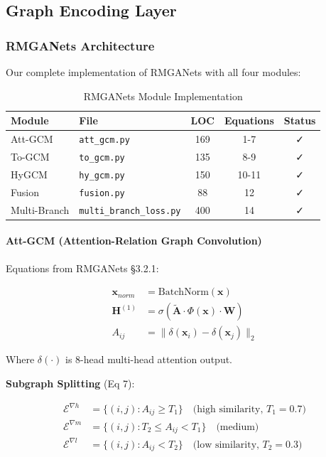 \documentclass[11pt,a4paper]{article}
\begin{document}
\subsection{Graph Encoding Layer}

\subsubsection{RMGANets Architecture}

Our complete implementation of RMGANets \cite{rmganets2024} with all four modules:

\begin{table}[htbp]
\centering
\caption{RMGANets Module Implementation}
\label{tab:rmganets_modules}
\begin{tabular}{@{}llccc@{}}
\toprule
\textbf{Module} & \textbf{File} & \textbf{LOC} & \textbf{Equations} & \textbf{Status} \\
\midrule
Att-GCM & \texttt{att\_gcm.py} & 169 & 1-7 & ✓ \\
To-GCM & \texttt{to\_gcm.py} & 135 & 8-9 & ✓ \\
HyGCM & \texttt{hy\_gcm.py} & 150 & 10-11 & ✓ \\
Fusion & \texttt{fusion.py} & 88 & 12 & ✓ \\
Multi-Branch & \texttt{multi\_branch\_loss.py} & 400 & 14 & ✓ \\
\bottomrule
\end{tabular}
\end{table}

\paragraph{Att-GCM (Attention-Relation Graph Convolution)}

Equations from RMGANets §3.2.1:

\begin{align}
\mathbf{x}_{norm} &= \text{BatchNorm}(\mathbf{x}) \tag{Eq 1} \\
\mathbf{H}^{(1)} &= \sigma(\tilde{\mathbf{A}} \cdot \Phi(\mathbf{x}) \cdot \mathbf{W}) \tag{Eq 2} \\
A_{ij} &= \|\delta(\mathbf{x}_i) - \delta(\mathbf{x}_j)\|_2 \tag{Eq 5-6}
\end{align}

Where $\delta(\cdot)$ is 8-head multi-head attention output.

\textbf{Subgraph Splitting} (Eq 7):

\begin{align}
\mathcal{E}^{\nabla h} &= \{(i,j) : A_{ij} \geq T_1\} \quad \text{(high similarity, $T_1=0.7$)} \\
\mathcal{E}^{\nabla m} &= \{(i,j) : T_2 \leq A_{ij} < T_1\} \quad \text{(medium)} \\
\mathcal{E}^{\nabla l} &= \{(i,j) : A_{ij} < T_2\} \quad \text{(low similarity, $T_2=0.3$)}
\end{align}
\end{document}
